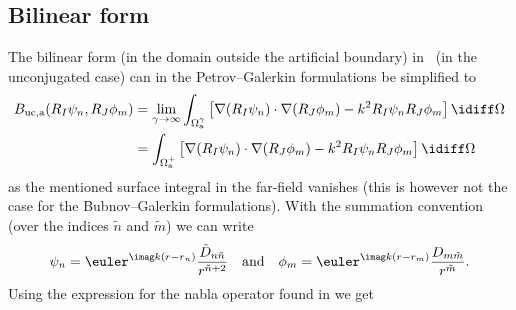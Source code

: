 \subsection{Bilinear form}
The bilinear form (in the domain outside the artificial boundary) in~ (in the unconjugated case) can in the Petrov--Galerkin formulations be simplified to
\begin{align}\label{Eq2:BilinearFormInserted}
	\begin{split}
	B_{\mathrm{uc},\mathrm{a}}(R_I\psi_n,R_J\phi_m) &= \lim_{\gamma\to\infty}\int_{\Omega_{\mathrm{a}}^\gamma} \left[\nabla(R_I\psi_n)\cdot \nabla (R_J\phi_m)- k^2 R_I\psi_n R_J\phi_m\right]\idiff\Omega\\
		&=\int_{\Omega_{\mathrm{a}}^+} \left[\nabla(R_I\psi_n)\cdot \nabla (R_J\phi_m)- k^2 R_I\psi_n R_J\phi_m\right]\idiff\Omega
	\end{split}
\end{align}
as the mentioned surface integral in the far-field vanishes (this is however not the case for the Bubnov--Galerkin formulations). With the summation convention (over the indices $\tilde{n}$ and $\tilde{m}$) we can write
\begin{equation*}
	\psi_n = \euler^{\imag k(r-r_n)}\frac{\tilde{D}_{n\tilde{n}}}{r^{\tilde{n}+2}}\quad\text{and}\quad\phi_m = \euler^{\imag k(r-r_m)}\frac{D_{m\tilde{m}}}{r^{\tilde{m}}}.
\end{equation*}
Using the expression for the nabla operator found in  we get
